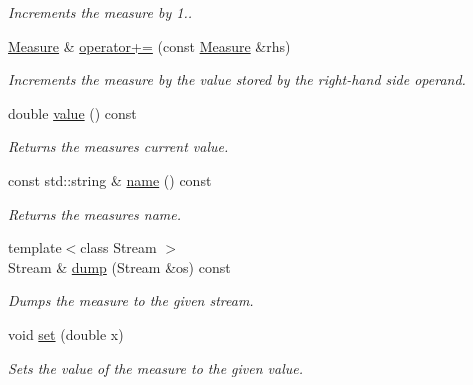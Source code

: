 \begin{DoxyCompactItemize}
\begin{DoxyCompactList}\small\item\em Increments the measure by 1.. \end{DoxyCompactList}\item 
\hyperlink{structslb_1_1core_1_1sb_1_1Measure}{Measure} \& \hyperlink{structslb_1_1core_1_1sb_1_1Measure_ab33da7167bfc70a303542705d6323c0b}{operator+=} (const \hyperlink{structslb_1_1core_1_1sb_1_1Measure}{Measure} \&rhs)
\begin{DoxyCompactList}\small\item\em Increments the measure by the value stored by the right-\/hand side operand. \end{DoxyCompactList}\item 
double \hyperlink{structslb_1_1core_1_1sb_1_1Measure_aeff5f54a7ae27b3657ff6ea95b530cf0}{value} () const 
\begin{DoxyCompactList}\small\item\em Returns the measure\textquotesingle{}s current value. \end{DoxyCompactList}\item 
const std\+::string \& \hyperlink{structslb_1_1core_1_1sb_1_1Measure_acb402da1376702968dc1c78652c5756f}{name} () const 
\begin{DoxyCompactList}\small\item\em Returns the measure\textquotesingle{}s name. \end{DoxyCompactList}\item 
{\footnotesize template$<$class Stream $>$ }\\Stream \& \hyperlink{structslb_1_1core_1_1sb_1_1Measure_aa8bfd5e11596bc4cfd45e8d1e2a40492}{dump} (Stream \&os) const 
\begin{DoxyCompactList}\small\item\em Dumps the measure to the given stream. \end{DoxyCompactList}\item 
void \hyperlink{structslb_1_1core_1_1sb_1_1Measure_a280ea5435ec54886714e116d40f8262e}{set} (double x)
\begin{DoxyCompactList}\small\item\em Sets the value of the measure to the given value. \end{DoxyCompactList}\end{DoxyCompactItemize}
